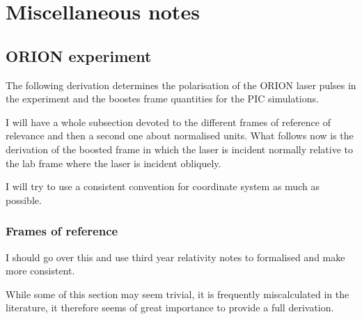 \chapter{\label{ch:x-misc}Miscellaneous notes}

\minitoc

\section{ORION experiment} 
The following derivation determines the polarisation of the ORION laser pulses in the experiment and the boostes frame quantities for the PIC simulations.

I will have a whole subsection devoted to the different frames of reference of relevance and then a second one about normalised units. What follows now is the derivation of the boosted frame in which the laser is incident normally relative to the lab frame where the laser is incident obliquely.

I will try to use a consistent convention for coordinate system as much as possible.

\subsection{Frames of reference}
I should go over this and use third year relativity notes to formalised and make more consistent.

While some of this section may seem trivial, it is frequently miscalculated in the literature, it therefore seems of great importance to provide a full derivation.

